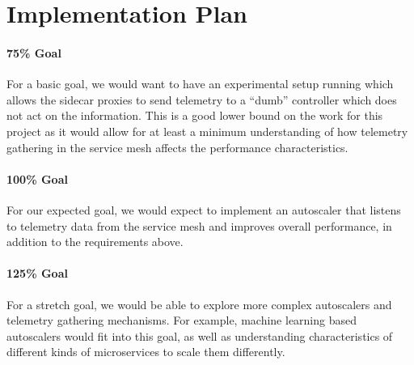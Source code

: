 \documentclass{proposal}
\begin{document}
\section{Implementation Plan} \label{implementation}
\paragraph*{75\% Goal} For a basic goal, we would want to have an experimental setup running which allows the sidecar proxies to send telemetry to a ``dumb'' controller which does not act on the information. This is a good lower bound on the work for this project as it would allow for at least a minimum understanding of how telemetry gathering in the service mesh affects the performance characteristics.

\paragraph*{100\% Goal} For our expected goal, we would expect to implement an autoscaler that listens to telemetry data from the service mesh and improves overall performance, in addition to the requirements above.

\paragraph*{125\% Goal} For a stretch goal, we would be able to explore more complex autoscalers and telemetry gathering mechanisms. For example, machine learning based autoscalers would fit into this goal, as well as understanding characteristics of different kinds of microservices to scale them differently.
\end{document}
